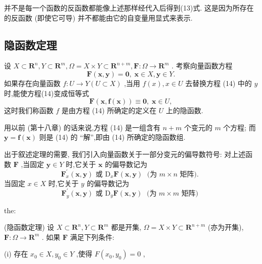 \begin{remark}

\end{remark}
并不是每一个函数的反函数都能像上述那样经代入后得到(13)式. 这是因为所存在的反函数 (即使它可导) 并不都能由它的自变量用显式来表示.

\subsection{隐函数定理}

设 \(X \subset  {\mathbf{R}}^{n},Y \subset  {\mathbf{R}}^{m},\Omega  = X \times  Y \subset  {\mathbf{R}}^{n + m},\mathbf{F} : \Omega  \rightarrow  {\mathbf{R}}^{m}\) . 考察向量函数方程
\[
\mathbf{F}\left( {\mathbf{x},\mathbf{y}}\right)  = \mathbf{0},\;\mathbf{x} \in  X,\mathbf{y} \in  Y. \tag{14}
\]
如果存在向量函数 \(f : U \rightarrow  Y\left( {U \subset  X}\right)\) ,当用 \(f\left( x\right) ,x \in  U\) 去替换方程 (14) 中的 \(y\) 时,能使方程(14)变成恒等式
\[
\mathbf{F}\left( {\mathbf{x},\mathbf{f}\left( \mathbf{x}\right) }\right)  \equiv  \mathbf{0},\;\mathbf{x} \in  U, \tag{15}
\]
这时我们称函数 \(f\) 是由方程 (14) 所确定的定义在 \(U\) 上的隐函数.

用以前 (第十八章) 的话来说,方程 (14) 是一组含有 \(n + m\) 个变元的 \(m\) 个方程; 而 \(\mathbf{y} = \mathbf{f}\left( \mathbf{x}\right)\) 则是 (14) 的 “解”,即由 (14) 所确定的隐函数组.

出于叙述定理的需要, 我们引入向量函数关于一部分变元的偏导数符号: 对上述函数 \(\mathbf{F}\) ,当固定 \(\mathbf{y} \in  Y\) 时,它关于 \(\mathbf{x}\) 的偏导数记为
\[
{\mathbf{F}}_{x}^{\prime }\left( {\mathbf{x},\mathbf{y}}\right) \text{ 或 }{\mathrm{D}}_{x}\mathbf{F}\left( {\mathbf{x},\mathbf{y}}\right) \;\text{ (为 }m \times  n\text{ 矩阵). } \tag{16}
\]
当固定 \(x \in  X\) 时,它关于 \(y\) 的偏导数记为
\[
{\mathbf{F}}_{y}^{\prime }\left( {\mathbf{x},\mathbf{y}}\right) \text{ 或 }{\mathrm{D}}_{y}\mathbf{F}\left( {\mathbf{x},\mathbf{y}}\right) \;\text{ (为 }m \times  m\text{ 矩阵) } \tag{17}
\]
\begin{theorem}{}{the:}

\end{theorem}
 (隐函数定理) 设 \(X \subset  {\mathbf{R}}^{n},Y \subset  {\mathbf{R}}^{m}\) 都是开集, \(\Omega  = X \times  Y \subset  {\mathbf{R}}^{n + m}\) (亦为开集), \(\mathbf{F} : \Omega  \rightarrow  {\mathbf{R}}^{m}\) . 如果 \(\mathbf{F}\) 满足下列条件:

(i) 存在 \({x}_{0} \in  X,{y}_{0} \in  Y\) ,使得 \(F\left( {{x}_{0},{y}_{0}}\right)  = 0\) ,


